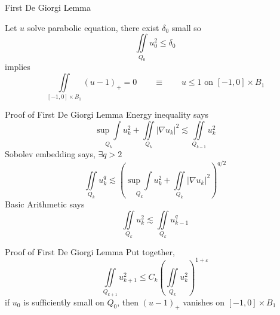 \documentclass{beamer}
\newcommand{\N}{\mathbb{N}}
\newcommand{\eps}{\varepsilon}
\newcommand{\paren}[1]{\left( #1 \right)}
\newcommand{\grad}{\nabla}
\begin{document}


\begin{frame}{First De Giorgi Lemma}
\begin{lemma}
Let $u$ solve parabolic equation, there exist $\delta_0$ small so
\[ \iint\limits_{Q_0} u_0^2 \leq \delta_0 \]
implies 
\[ \iint\limits_{[-1,0]\times B_1} (u-1)_+ = 0 \qquad \equiv \qquad u \leq 1 \textrm{ on } [-1,0]\times B_1 \]
\end{lemma}

\end{frame}


\begin{frame}{Proof of First De Giorgi Lemma}
Energy inequality says
\[ \underset{Q_k}{\sup \int} u_k^2 + \iint\limits_{Q_k} |\grad u_k|^2 \lesssim \iint\limits_{Q_{k-1}} u_k^2 \]
\pause
Sobolev embedding says, $\exists q > 2$
\[ \iint\limits_{Q_k} u_k^q \lesssim \paren{ \underset{Q_k}{\sup \int} u_k^2 + \iint\limits_{Q_k} |\grad u_k|^2 }^{q/2} \]
\pause
Basic Arithmetic says
\[ \iint\limits_{Q_k} u_k^2 \lesssim \iint\limits_{Q_k} u_{k-1}^q \]

\end{frame}


\begin{frame}{Proof of First De Giorgi Lemma}
Put together, 
\[ \iint\limits_{Q_{k+1}} u_{k+1}^2 \leq C_k \paren{ \iint\limits_{Q_k} u_k^2 }^{1+\eps} \]
if $u_0$ is sufficiently small on $Q_0$, then $(u-1)_+$ vanishes on $[-1,0]\times B_1$
\end{frame}
\end{document}
